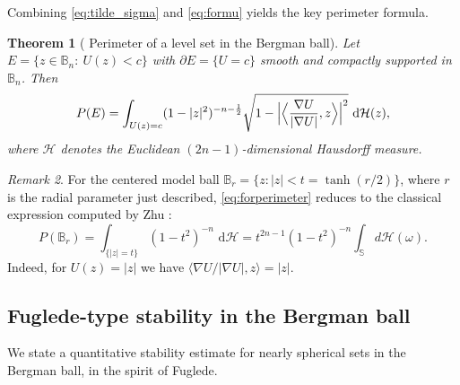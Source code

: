 \documentclass[11pt]{amsart}
\theoremstyle{plain}
\newtheorem{theorem}{Theorem}[section]
\theoremstyle{definition}
\theoremstyle{remark}
\newtheorem{remark}[theorem]{Remark}
\newcommand{\Bn}{\mathbb{B}_n}
\newcommand{\Sph}{\mathbb{S}}
\newcommand{\dd}{\,\mathrm{d}}
\begin{document}
Combining \eqref{eq:tilde_sigma} and \eqref{eq:formu} yields the key perimeter formula.

\begin{theorem}[\cite{KalajBergman2026Arxiv} Perimeter of a level set in the Bergman ball]\label{thm:perimeter_formula}
Let $E=\{z\in\Bn:\ U(z)<c\}$ with $\partial E=\{U=c\}$ smooth and compactly supported in $\Bn$.
Then
\begin{equation}\label{eq:forperimeter}
P(E)=\int_{U(z)=c}(1-|z|^2)^{-n-\frac12}
\sqrt{1-\Bigl|\Bigl\langle \frac{\nabla U}{|\nabla U|},z\Bigr\rangle\Bigr|^2}\,\dd\mathcal{H}(z),
\end{equation}
where $\mathcal{H}$ denotes the Euclidean $(2n-1)$-dimensional Hausdorff measure.
\end{theorem}

\begin{remark}
For the centered model ball $\mathbb{B}_r=\{z:|z|<t=\tanh(r/2)\}$, where $r$
is the radial parameter just described, \eqref{eq:forperimeter} reduces to the
classical expression computed by Zhu \cite{ZhuUnitBall2005}:
\begin{equation*}\label{eq:br_zhu}
P(\mathbb{B}_r)=\int_{\{ |z|=t\}}(1-t^2)^{-n}\,\dd\mathcal{H}
=t^{2n-1}(1-t^2)^{-n}\int_{\Sph}d\mathcal H(\omega).
\end{equation*}
Indeed, for $U(z)=|z|$ we have $\langle \nabla U/|\nabla U|,z\rangle=|z|$.
\end{remark}

\subsection{Fuglede-type stability in the Bergman ball}

We state a quantitative stability estimate for nearly spherical sets in the Bergman ball, in the spirit of Fuglede.
\end{document}
